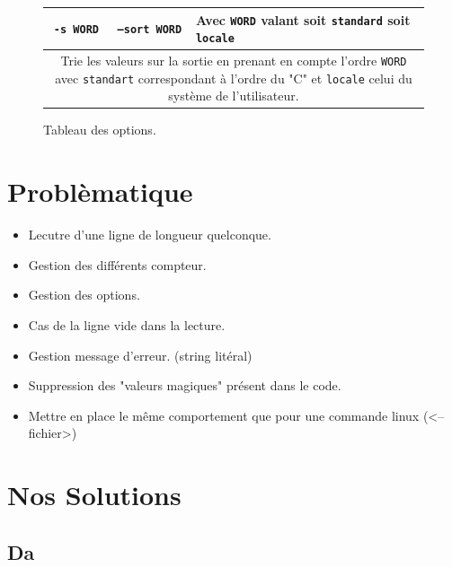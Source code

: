 \documentclass[12pt]{article}
\begin{document}
\begin{figure}[t]
\begin{tabularx}{\textwidth}{|c|c|X|}
            \hline
                \multirow{1}{*}{\cellcolor{blue-s!25}\texttt{-s WORD}} & \multirow{1}{*}{\cellcolor{blue-s!25}\texttt{--sort WORD}} & \multirow{1}{*}{{ \cellcolor{blue-t!70}Avec \texttt{WORD} valant soit \texttt{standard} soit \texttt{locale}}}\\
            \hline
                \multicolumn{3}{|c|}{\cellcolor{blue-u!7}\rule{0pt}{2em}\parbox{15cm}{{Trie les valeurs sur la sortie en prenant en compte l'ordre \texttt{WORD} avec \texttt{standart}} correspondant à l'ordre du "C" et \texttt{locale} celui du système de l'utilisateur.}}\\[1em]
            \hline
          \end{tabularx}
        \caption{Tableau des options.}
       \label{opt-tab}
    \end{figure}

    \clearpage
    \newpage

    \section{Problèmatique}
        
        \begin{itemize}
            \item Lecutre d'une ligne de longueur quelconque.
            \item Gestion des différents compteur.
            \item Gestion des options.
            \item Cas de la ligne vide dans la lecture.
            \item Gestion message d'erreur. (string litéral)
            \item Suppression des "valeurs magiques" présent dans le code.
            \item Mettre en place le même comportement que pour une commande linux (<-- fichier>)
        \end{itemize}

    \newpage
    
    \section{Nos Solutions}

        \subsection{Da}
        
\end{document}
